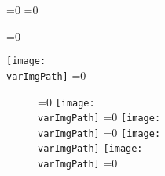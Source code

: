 
\captionsetup[figure]{	
	font=\varFigCapLabelSize,
}
\ifnum{}=0
\captionsetup[figure]{
		labelformat=empty,
}
\fi
\ifnum{}=0
\captionsetup[figure]{
		labelformat=empty,
}
\fi




\ifnum{}=0 
	\begin{wrapfigure}{\varFigFloat}{\varFigWidth\textwidth}
		\vspace{-12pt} %
		\texttt{[image: \\varImgPath]} 
		\ifnum\pdfstrcmp{\varCaption	}{}=0 \else \caption{\varCaption} \fi 
	\end{wrapfigure}
\else
	\begin{figure}[\varFigPlacement]
	\centering
	\ifnum{}=0 
		\texttt{[image: \\varImgPath]}
	\else
		\ifnum{}=0 
			\texttt{[image: \\varImgPath]}			
		\else
			\ifnum{}=0 
				\texttt{[image: \\varImgPath]}			
			\else
				\texttt{[image: \\varImgPath]}
			\fi 
		\fi 
	\fi 
	\ifnum\pdfstrcmp{\varCaption}{}=0 \else \caption{\varCaption} \fi 
	\end{figure}
\fi 